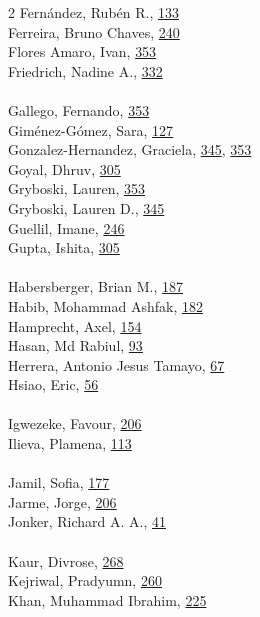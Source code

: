\documentclass[11pt,oneside]{book}
\begin{document}
\begin{multicols}{2}
Fernández, Rubén R., \hyperlink{page.133}{133}\\
Ferreira, Bruno Chaves, \hyperlink{page.240}{240}\\
Flores Amaro, Ivan, \hyperlink{page.353}{353}\\
Friedrich, Nadine A., \hyperlink{page.332}{332}\\
\\ %
Gallego, Fernando, \hyperlink{page.353}{353}\\
Giménez-Gómez, Sara, \hyperlink{page.127}{127}\\
Gonzalez-Hernandez, Graciela, \hyperlink{page.345}{345}, \hyperlink{page.353}{353}\\
Goyal, Dhruv, \hyperlink{page.305}{305}\\
Gryboski, Lauren, \hyperlink{page.353}{353}\\
Gryboski, Lauren D., \hyperlink{page.345}{345}\\
Guellil, Imane, \hyperlink{page.246}{246}\\
Gupta, Ishita, \hyperlink{page.305}{305}\\
\\ %
Habersberger, Brian M., \hyperlink{page.187}{187}\\
Habib, Mohammad Ashfak, \hyperlink{page.182}{182}\\
Hamprecht, Axel, \hyperlink{page.154}{154}\\
Hasan, Md Rabiul, \hyperlink{page.93}{93}\\
Herrera, Antonio Jesus Tamayo, \hyperlink{page.67}{67}\\
Hsiao, Eric, \hyperlink{page.56}{56}\\
\\ %
Igwezeke, Favour, \hyperlink{page.206}{206}\\
Ilieva, Plamena, \hyperlink{page.113}{113}\\
\\ %
Jamil, Sofia, \hyperlink{page.177}{177}\\
Jarme, Jorge, \hyperlink{page.206}{206}\\
Jonker, Richard A. A., \hyperlink{page.41}{41}\\
\\ %
Kaur, Divrose, \hyperlink{page.268}{268}\\
Kejriwal, Pradyumn, \hyperlink{page.260}{260}\\
Khan, Muhammad Ibrahim, \hyperlink{page.225}{225}\\

\end{multicols}
\end{document}
